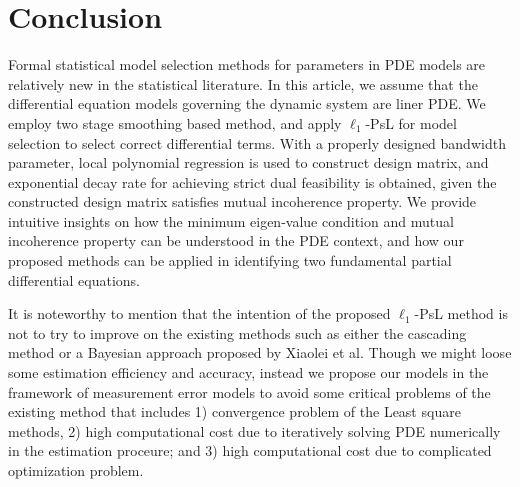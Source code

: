 \documentclass[a4paper,11pt]{article}
\begin{document}
\section{Conclusion}
Formal statistical model selection methods for parameters in PDE models are relatively new in the statistical literature. In this article, we assume that the differential equation models governing the dynamic system are liner PDE. We employ two stage smoothing based method, and apply $\ell_{1}$-PsL for model selection to select correct differential terms. With a properly designed bandwidth parameter, local polynomial regression is used to construct design matrix, and exponential decay rate for achieving strict dual feasibility is obtained, given the constructed design matrix satisfies mutual incoherence property. We provide intuitive insights on how the minimum eigen-value condition and mutual incoherence property can be understood in the PDE context, and how our proposed methods can be applied in identifying two fundamental partial differential equations.

It is noteworthy to mention that the intention of the proposed $\ell_{1}$-PsL method is not to try to improve on the existing methods such as either the cascading method or a Bayesian approach proposed by Xiaolei et al. Though we might loose some estimation efficiency and accuracy, instead we propose our models in the framework of measurement error models to avoid some critical problems of the existing method that includes
1) convergence problem of the Least square methods,
2) high computational cost due to iteratively solving PDE numerically in the estimation proceure; and
3) high computational cost due to complicated optimization problem.
\end{document}
